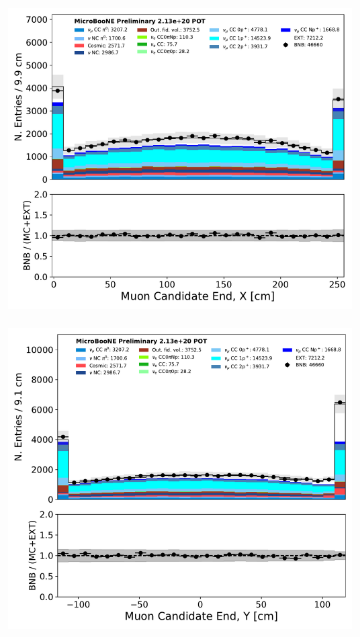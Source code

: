 \begin{figure}[H]
    \centering
        \begin{subfigure}[b]{0.3\textwidth}
        \centering
        \includegraphics[width=\textwidth]{NuMuCCsel/Images/Ryan/appendix_muonsel_input_R3/trk_sce_end_x_v_07232020_presel_samples_detsys_event_category.pdf}
        \end{subfigure}
        \begin{subfigure}[b]{0.3\textwidth}
        \centering
        \includegraphics[width=\textwidth]{NuMuCCsel/Images/Ryan/appendix_muonsel_input_R3/trk_sce_end_y_v_07232020_presel_samples_detsys_event_category.pdf}

\end{subfigure}
\end{figure}
